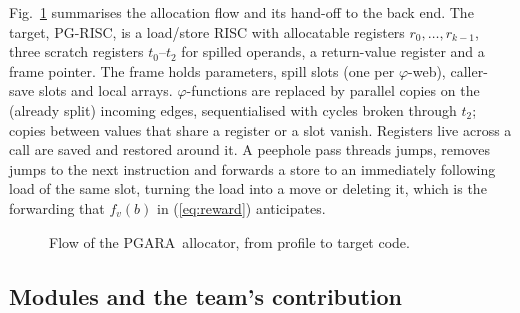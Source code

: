 \documentclass[conference]{IEEEtran}
\newcommand{\MG}{PGARA}
\begin{document}
Fig.~\ref{fig:allocflow} summarises the allocation flow and its
hand-off to the back end. The target, PG-RISC, is a load/store RISC with
allocatable registers $r_0,\dots,r_{k-1}$, three scratch registers
$t_0$--$t_2$ for spilled operands, a return-value register and a frame
pointer. The frame holds parameters, spill slots (one per $\varphi$-web),
caller-save slots and local arrays. $\varphi$-functions are replaced by
parallel copies on the (already split) incoming edges, sequentialised
with cycles broken through $t_2$; copies between values that share a
register or a slot vanish. Registers live across a call are saved and
restored around it. A peephole pass threads jumps, removes jumps to the
next instruction and forwards a store to an immediately following load
of the same slot, turning the load into a move or deleting it, which
is the forwarding that $f_v(b)$ in (\ref{eq:reward}) anticipates.

\begin{figure}[t]
\centering
{}
\caption{Flow of the \MG\ allocator, from profile to target code.}
\label{fig:allocflow}
\end{figure}

\subsection{Modules and the team's contribution}
\end{document}
